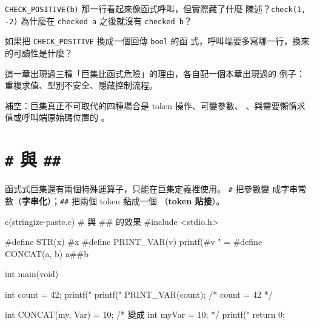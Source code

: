 
\begin{drills}[label=drills:pp-guidelines]
\item \texttt{CHECK\_POSITIVE(b)} 那一行看起來像函式呼叫，但實際藏了什麼
陳述？\texttt{check(1, -2)} 為什麼在 \texttt{checked a} 之後就沒有
\texttt{checked b}？
\item 如果把 \texttt{CHECK\_POSITIVE} 換成一個回傳 \texttt{bool} 的函
式，呼叫端要多寫哪一行，換來的可讀性是什麼？
\item 這一章出現過三種「巨集比函式危險」的理由，各自配一個本章出現過的
例子：重複求值、型別不安全、隱藏控制流程。
\item 補空：巨集真正不可取代的四種場合是 token 操作、可變參數、
\underline{\hspace{2em}}、與需要懶惰求值或呼叫端原始碼位置的
\underline{\hspace{2em}}。
\end{drills}

\section{\texttt{\#} 與 \texttt{\#\#}}
\label{sec:pp-stringize}

函式式巨集還有兩個特殊運算子，只能在巨集定義裡使用。 \texttt{\#} 把參數變
成字串常數（\textbf{字串化}）；\texttt{\#\#} 把兩個 token 黏成一個
（\textbf{token 貼接}）。

\begin{example}{c}{(stringize-paste.c) \# 與 \#\# 的效果}
#include <stdio.h>

#define STR(x) #x
#define PRINT_VAR(v) printf(#v " = %
#define CONCAT(a, b) a##b

int main(void) {
    int count = 42;
    printf("%
    printf("%
    PRINT_VAR(count);               /* count = 42 */

    int CONCAT(my, Var) = 10;       /* 變成 int myVar = 10; */
    printf("%
    return 0;
}
\end{example}


